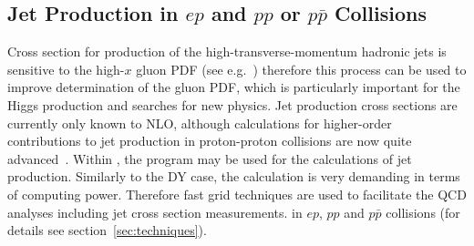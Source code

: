 
\subsection{Jet Production in $ep$ and $pp$ or $p \bar p$ Collisions}
\label{jetsection}

Cross section for production of the high-transverse-momentum hadronic jets
is sensitive to the high-$x$ gluon 
PDF (see e.g.~\cite{MSTWpdf}) 
therefore this process can be used to improve determination of the gluon PDF,
which is particularly important for the Higgs production and searches for new physics.
Jet production cross sections are currently only known to NLO, although 
calculations for higher-order contributions to jet production in proton-proton collisions
are now quite advanced~\cite{nigel:2013,nigel:2010,Currie:2013dwa}. 
Within \fitter, the \nlojetpp program \cite{Nagy:1998bb,Nagy:2001fj} may be used for the 
calculations of jet production.
Similarly to the DY case, the calculation 
is very demanding in terms of computing power. 
Therefore fast grid techniques are used  
to facilitate the QCD analyses including jet cross section measurements.
in $ep$, $pp$ and $p\bar{p}$ collisions
(for details see section~\ref{sec:techniques}).





